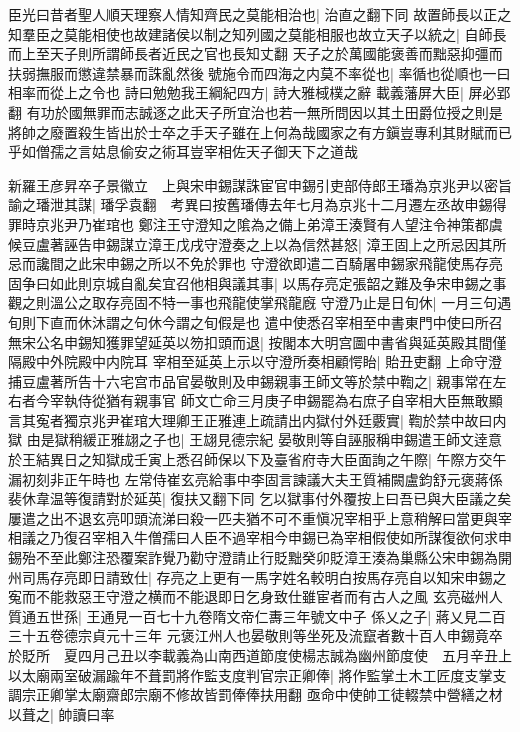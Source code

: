 臣光曰昔者聖人順天理察人情知齊民之莫能相治也|{
	治直之翻下同}
故置師長以正之知羣臣之莫能相使也故建諸侯以制之知列國之莫能相服也故立天子以統之|{
	自師長而上至天子則所謂師長者近民之官也長知丈翻}
天子之於萬國能褒善而黜惡抑彊而扶弱撫服而懲違禁暴而誅亂然後號施令而四海之内莫不率從也|{
	率循也從順也一曰相率而從上之令也}
詩曰勉勉我王綱紀四方|{
	詩大雅棫樸之辭}
載義藩屏大臣|{
	屏必郢翻}
有功於國無罪而志誠逐之此天子所宜治也若一無所問因以其土田爵位授之則是將帥之廢置殺生皆出於士卒之手天子雖在上何為哉國家之有方鎭豈專利其財賦而已乎如僧孺之言姑息偷安之術耳豈宰相佐天子御天下之道哉

新羅王彦昇卒子景徽立　上與宋申錫謀誅宦官申錫引吏部侍郎王璠為京兆尹以密旨諭之璠泄其謀|{
	璠孚袁翻　考異曰按舊璠傳去年七月為京兆十二月遷左丞故申錫得罪時京兆尹乃崔琯也}
鄭注王守澄知之隂為之備上弟漳王湊賢有人望注令神策都虞候豆盧著誣告申錫謀立漳王戊戌守澄奏之上以為信然甚怒|{
	漳王固上之所忌因其所忌而讒間之此宋申錫之所以不免於罪也}
守澄欲即遣二百騎屠申錫家飛龍使馬存亮固争曰如此則京城自亂矣宜召他相與議其事|{
	以馬存亮定張韶之難及争宋申錫之事觀之則溫公之取存亮固不特一事也飛龍使掌飛龍廐}
守澄乃止是日旬休|{
	一月三句遇旬則下直而休沐謂之句休今謂之旬假是也}
遣中使悉召宰相至中書東門中使曰所召無宋公名申錫知獲罪望延英以笏扣頭而退|{
	按閣本大明宫圖中書省與延英殿其間僅隔殿中外院殿中内院耳}
宰相至延英上示以守澄所奏相顧愕眙|{
	貽丑吏翻}
上命守澄捕豆盧著所告十六宅宫市品官晏敬則及申錫親事王師文等於禁中鞫之|{
	親事常在左右者今宰執侍從猶有親事官}
師文亡命三月庚子申錫罷為右庶子自宰相大臣無敢顯言其寃者獨京兆尹崔琯大理卿王正雅連上疏請出内獄付外廷覈實|{
	鞫於禁中故曰内獄}
由是獄稍緩正雅翃之子也|{
	王翃見德宗紀}
晏敬則等自誣服稱申錫遣王師文逹意於王結異日之知獄成壬寅上悉召師保以下及臺省府寺大臣面詢之午際|{
	午際方交午漏初刻非正午時也}
左常侍崔玄亮給事中李固言諫議大夫王質補闕盧鈞舒元褒蔣係裴休韋温等復請對於延英|{
	復扶又翻下同}
乞以獄事付外覆按上曰吾已與大臣議之矣屢遣之出不退玄亮叩頭流涕曰殺一匹夫猶不可不重愼况宰相乎上意稍解曰當更與宰相議之乃復召宰相入牛僧孺曰人臣不過宰相今申錫已為宰相假使如所謀復欲何求申錫殆不至此鄭注恐覆案詐覺乃勸守澄請止行貶黜癸卯貶漳王湊為巢縣公宋申錫為開州司馬存亮即日請致仕|{
	存亮之上更有一馬字姓名較明白按馬存亮自以知宋申錫之寃而不能救惡王守澄之横而不能退即日乞身致仕雖宦者而有古人之風}
玄亮磁州人質通五世孫|{
	王通見一百七十九卷隋文帝仁夀三年號文中子}
係乂之子|{
	蔣乂見二百三十五卷德宗貞元十三年}
元褒江州人也晏敬則等坐死及流竄者數十百人申錫竟卒於貶所　夏四月己丑以李載義為山南西道節度使楊志誠為幽州節度使　五月辛丑上以太廟兩室破漏踰年不葺罰將作監支度判官宗正卿俸|{
	將作監掌土木工匠度支掌支調宗正卿掌太廟齋郎宗廟不修故皆罰俸俸扶用翻}
亟命中使帥工徒輟禁中營繕之材以葺之|{
	帥讀曰率}
